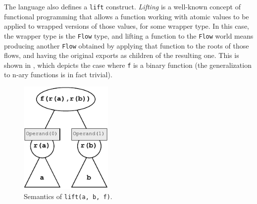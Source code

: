 The language also defines a \texttt{lift} construct.
%
\textit{Lifting} is a well-known concept of functional programming that allows a function working with atomic values to be applied to wrapped versions of those values, for some wrapper type.
%
In this case, the wrapper type is the \texttt{Flow} type, and lifting a function to the \texttt{Flow} world means producing another \texttt{Flow} obtained by applying that function to the roots of those flows, and having the original exports as children of the resulting one.
%
This is shown in , which depicts the case where \texttt{f} is a binary function (the generalization to n-ary functions is in fact trivial).
%
\begin{figure}
    \centering
    \includegraphics[width=0.4\textwidth]{figures/semantics/lift.pdf}
    \caption{Semantics of \texttt{lift(a, b, f)}.}
    \label{fig:semantics-lift}
\end{figure}


